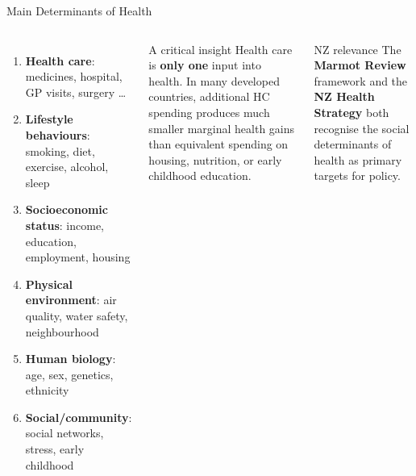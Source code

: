 \documentclass[aspectratio=169, 12pt]{beamer}
\begin{document}
\begin{frame}{Main Determinants of Health}
  \begin{columns}
      \begin{enumerate}
        \item \textbf{Health care}: medicines, hospital, GP visits, surgery \ldots
        \item \textbf{Lifestyle behaviours}: smoking, diet, exercise, alcohol, sleep
        \item \textbf{Socioeconomic status}: income, education, employment, housing
        \item \textbf{Physical environment}: air quality, water safety, neighbourhood
        \item \textbf{Human biology}: age, sex, genetics, ethnicity
        \item \textbf{Social/community}: social networks, stress, early childhood
      \end{enumerate}
      \begin{alertblock}{A critical insight}
        Health care is \textbf{only one} input into health. In many developed countries,
        additional HC spending produces much smaller marginal health gains than equivalent
        spending on housing, nutrition, or early childhood education.
      \end{alertblock}
      \vspace{0.3em}
      \begin{exampleblock}{NZ relevance}
        The \textbf{Marmot Review} framework and the \textbf{NZ Health Strategy} both recognise
        the social determinants of health as primary targets for policy.
      \end{exampleblock}
  \end{columns}
\end{frame}
\end{document}
